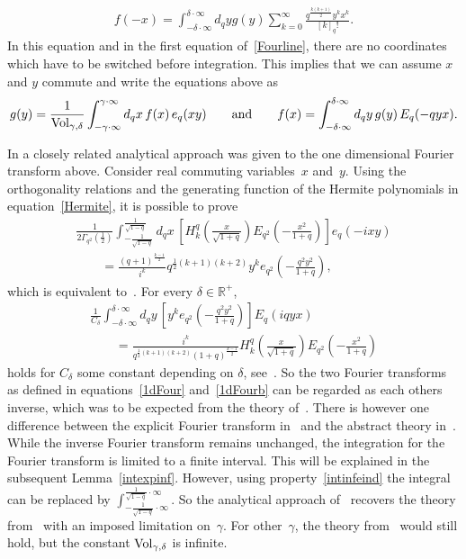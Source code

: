 \documentclass[11pt]{article}
\newcommand{\mR}{\mathbb{R}}
\numberwithin{equation}{section}
\begin{document}
\begin{gather*}
f(-x) = \int_{-\delta\cdot\infty}^{\delta\cdot\infty}d_qyg(y)\sum_{k=0}^\infty\frac{q^{\frac{k(k+1)}{2}}y^kx^k}{[k]_q!}.
\end{gather*}
In this equation and in the f\/irst equation of~\eqref{Fourline}, there are no coordinates which have to be switched before integration. This implies that we can assume $x$ and $y$ commute and write the equations above as
\begin{gather*}
g(y)=\frac{1}{{\rm Vol}_{\gamma,\delta}}\int_{-\gamma\cdot\infty}^{\gamma\cdot\infty}d_qx\,f(x)\,e_q(xy)\qquad \mbox{and}\qquad f(x)=\int_{-\delta\cdot\infty}^{\delta\cdot\infty}d_qy\,g(y)\,E_q(-qyx).
\end{gather*}



In \cite{MR1448685} a closely related analytical approach was given to the one dimensional Fourier transform above. Consider real commuting variables~$x$ and~$y$. Using the orthogonality relations and the generating function of the Hermite polynomials in equation~\eqref{Hermite}, it is possible to prove
\begin{gather}
\frac{1}{2\Gamma_{q^2}(\frac{1}{2})}\int_{-\frac{1}{\sqrt{1-q}}}^{\frac{1}{\sqrt{1-q}}}d_qx\, \left[H_k^q\left(\frac{x}{\sqrt{1+q}}\right)E_{q^2}\left(-\frac{x^2}{1+q}\right)\right]e_q(-ixy)\nonumber\\
\qquad{}
=\frac{(q+1)^{\frac{k-1}{2}}}{i^k}q^{\frac{1}{2}(k+1)(k+2)}y^ke_{q^2}\left(-\frac{q^2y^2}{1+q}\right),\label{1dFour}
\end{gather}
which is equivalent to~\cite[equation~(8.7)]{MR1448685}. For every $\delta\in\mR^+$,
\begin{gather}
\frac{1}{C_\delta}\int_{-\delta\cdot\infty}^{\delta\cdot\infty}d_qy\, \left[y^ke_{q^2}\left(-\frac{q^2y^2}{1+q}\right)\right]E_q(iqyx)\nonumber\\
\qquad =\frac{i^k}{q^{\frac{1}{2}(k+1)(k+2)}(1+q)^{\frac{k-1}{2}}}H_k^q\left(\frac{x}{\sqrt{1+q}}\right)E_{q^2}\left(-\frac{x^2}{1+q}\right)\label{1dFourb}
\end{gather}
holds for $C_\delta$ some constant depending on $\delta$, see~\cite[equation~(8.21)]{MR1448685}. So the two Fourier transforms as def\/ined in equations~\eqref{1dFour} and~\eqref{1dFourb} can be regarded as each others inverse, which was to be expected from the theory of~\cite{MR1303081}. There is however one dif\/ference between the explicit Fourier transform in~\cite{MR1448685} and the abstract theory in~\cite{MR1303081}. While the inverse Fourier transform remains unchanged, the integration for the Fourier transform is limited to a f\/inite interval. This will be explained in the subsequent Lemma~\ref{intexpinf}. However, using property~\eqref{intinfeind} the integral can be replaced by $\int_{-\frac{1}{\sqrt{1-q}}\cdot\infty}^{\frac{1}{\sqrt{1-q}}\cdot\infty}$. So the analytical approach of~\cite{MR1448685} recovers the theory from~\cite{MR1303081} with an imposed limitation on~$\gamma$. For other~$\gamma$, the theory from~\cite{MR1303081} would still hold, but the constant ${\rm Vol}_{\gamma,\delta}$ is inf\/inite.
\end{document}
